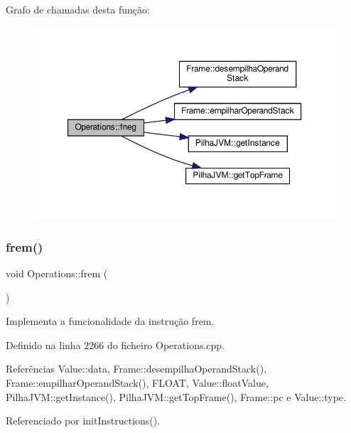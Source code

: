 Grafo de chamadas desta função\+:
\nopagebreak
\begin{figure}[H]
\begin{center}
\leavevmode
\includegraphics[width=350pt]{classOperations_a17a7d8f333373d30ae5b1595d96594e5_cgraph}
\end{center}
\end{figure}
\mbox{\label{classOperations_ad29eac4f222e4b74667086c3da0d5538}} 
\subsubsection{\texorpdfstring{frem()}{frem()}}
{\footnotesize\ttfamily void Operations\+::frem (\begin{DoxyParamCaption}{ }\end{DoxyParamCaption})\hspace{0.3cm}{\ttfamily [private]}}



Implementa a funcionalidade da instrução frem. 



Definido na linha 2266 do ficheiro Operations.\+cpp.



Referências Value\+::data, Frame\+::desempilha\+Operand\+Stack(), Frame\+::empilhar\+Operand\+Stack(), F\+L\+O\+AT, Value\+::float\+Value, Pilha\+J\+V\+M\+::get\+Instance(), Pilha\+J\+V\+M\+::get\+Top\+Frame(), Frame\+::pc e Value\+::type.



Referenciado por init\+Instructions().


